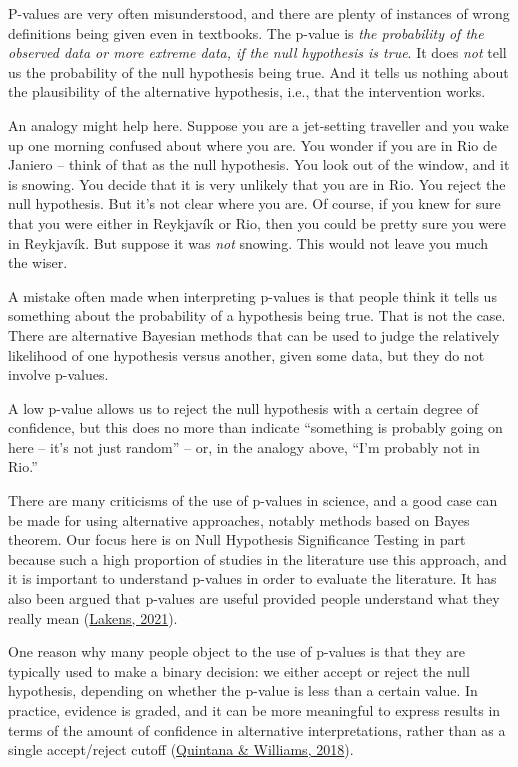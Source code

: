 \documentclass{krantz}
\begin{document}
P-values are very often misunderstood, and there are plenty of instances of wrong definitions being given even in textbooks. The p-value is \emph{the probability of the observed data or more extreme data, if the null hypothesis is true}. It does \emph{not} tell us the probability of the null hypothesis being true. And it tells us nothing about the plausibility of the alternative hypothesis, i.e., that the intervention works.

An analogy might help here. Suppose you are a jet-setting traveller and you wake up one morning confused about where you are. You wonder if you are in Rio de Janiero -- think of that as the null hypothesis. You look out of the window, and it is snowing. You decide that it is very unlikely that you are in Rio. You reject the null hypothesis. But it's not clear where you are. Of course, if you knew for sure that you were either in Reykjavík or Rio, then you could be pretty sure you were in Reykjavík. But suppose it was \emph{not} snowing. This would not leave you much the wiser.

A mistake often made when interpreting p-values is that people think it tells us something about the probability of a hypothesis being true. That is not the case. There are alternative Bayesian methods that can be used to judge the relatively likelihood of one hypothesis versus another, given some data, but they do not involve p-values.

A low p-value allows us to reject the null hypothesis with a certain degree of confidence, but this does no more than indicate ``something is probably going on here -- it's not just random'' -- or, in the analogy above, ``I'm probably not in Rio.''

\begin{tcolorbox}[colback=Black!5!lightgray,colframe=black!75!black,coltitle=white,title=Criticisms of the Use of p-values]\label{box:pvalues}
There are many criticisms of the use of p-values in science, and a good case can be made for using alternative approaches, notably methods based on Bayes theorem. Our focus here is on Null Hypothesis Significance Testing in part because such a high proportion of studies in the literature use this approach, and it is important to understand p-values in order to evaluate the literature. It has also been argued that p-values are useful provided people understand what they really mean (\protect\hyperlink{ref-lakens2021}{Lakens, 2021}).

One reason why many people object to the use of p-values is that they are typically used to make a binary decision: we either accept or reject the null hypothesis, depending on whether the p-value is less than a certain value. In practice, evidence is graded, and it can be more meaningful to express results in terms of the amount of confidence in alternative interpretations, rather than as a single accept/reject cutoff (\protect\hyperlink{ref-quintana2018}{Quintana \& Williams, 2018}).
\end{tcolorbox}
\end{document}
